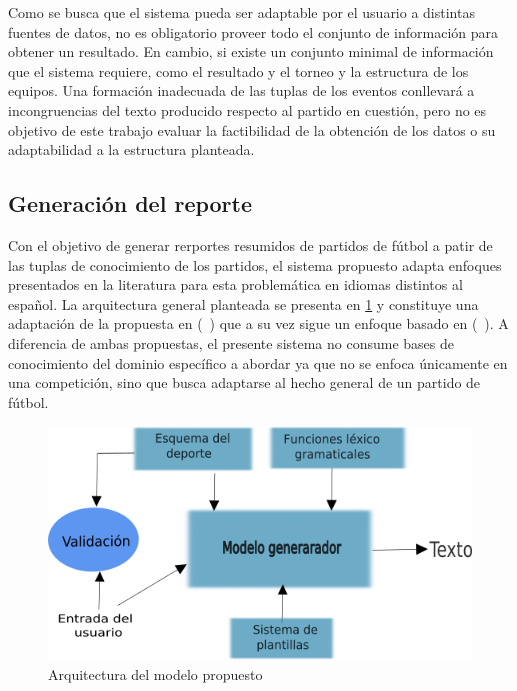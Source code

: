     Como se busca que el sistema pueda ser adaptable por el usuario a distintas fuentes de datos, no es obligatorio proveer todo el conjunto de información para 
obtener un resultado. En cambio, si existe un conjunto minimal de información que el sistema requiere, como el resultado y el torneo y la estructura de los equipos. 
Una formación inadecuada de las tuplas de los eventos conllevará a incongruencias del texto producido respecto al partido en cuestión, pero no es objetivo de 
este trabajo evaluar la factibilidad de la obtención de los datos o su adaptabilidad a la estructura planteada.


\subsection{Generación del reporte}

    Con el objetivo de generar rerportes resumidos de partidos de fútbol a patir de las tuplas de conocimiento de los partidos, el sistema propuesto adapta enfoques presentados 
en la literatura para esta problemática en idiomas distintos al español. La arquitectura general planteada se presenta en \ref{arquitecturadelmodelo} y constituye una 
adaptación de la propuesta en (~\cite{aires2016automatic}) que a su vez sigue un enfoque basado en (~\cite{theune2001data}). A diferencia de ambas propuestas, el 
presente sistema no consume bases de conocimiento del dominio específico a abordar ya que no se enfoca únicamente en una competición, sino que busca adaptarse al hecho 
general de un partido de fútbol. 


\begin{figure}[!]
    \begin{center}
        \includegraphics[scale=0.9]{Graphics/arquitecturaprop2.png}
    \end{center}
    \caption{Arquitectura del modelo propuesto}
    \label{arquitecturadelmodelo}
\end{figure}

